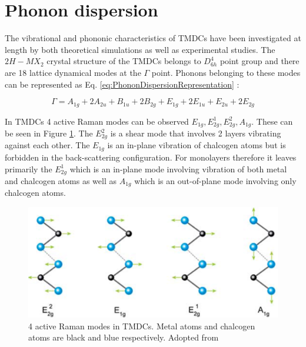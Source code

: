 	
\section{Phonon dispersion}
	
	The vibrational and phononic characteristics of TMDCs have been investigated at length by both theoretical simulations as well as experimental studies. The $2H-MX_2$ crystal structure of the TMDCs belongs to $D_{6h}^4$ point group and there are 18 lattice dynamical modes at the $\Gamma$ point. Phonons belonging to these modes can be represented as Eq. \ref{eq:PhononDispersionRepresentation} \cite{LatticeDynamicsInMono-AndFew-LayerSheetsOfWS2AndWSe2}: 
	
\begin{equation}
	{\Gamma} = A_{1g} + 2A_{2u} + B_{1u} + 2B_{2g} + E_{1g} + 2E_{1u} + E_{2u} + 2E_{2g}
	\label{eq:PhononDispersionRepresentation} 
\end{equation}
	
	In TMDCs 4 active Raman modes can be observed $E_{1g}, E^1_{2g}, E^2_{2g}, A_{1g}$. These can be seen in Figure \ref{fig:4ActiveRamanModes}. The $E^2_{2g}$ is a shear mode that involves 2 layers vibrating against each other. The $E_{1g}$ is an in-plane vibration of chalcogen atoms but is forbidden in the back-scattering configuration. For monolayers therefore it leaves primarily the $E^1_{2g}$ which is an in-plane mode involving vibration of both metal and chalcogen atoms as well as $A_{1g}$ which is an out-of-plane mode involving only chalcogen atoms. 
	
\begin{figure}[h]
	\begin{center}
		\includegraphics[scale=0.2]{RamanActiveModes.png}
		\caption{4 active Raman modes in TMDCs. Metal atoms and chalcogen atoms are black and blue respectively. Adopted from \cite{LatticeDynamicsInMono-AndFew-LayerSheetsOfWS2AndWSe2}}
		\label{fig:4ActiveRamanModes}
	\end{center}
\end{figure}
	
